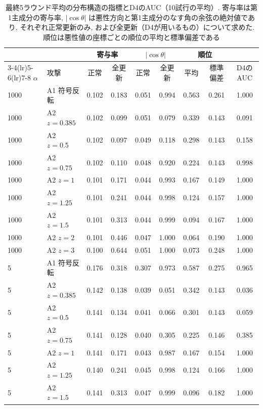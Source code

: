 \documentclass[a4j, twocolumn, dvipdfmx]{jsarticle}
\begin{document}
\begin{table}[t]
\centering
\caption{最終5ラウンド平均の分布構造の指標とD4のAUC（10試行の平均）. 寄与率は第1主成分の寄与率, $|\cos\theta|$ は悪性方向と第1主成分のなす角の余弦の絶対値であり, それぞれ正常更新のみ, および全更新（D4が用いるもの）について求めた. 順位は悪性値の座標ごとの順位の平均と標準偏差である}
\label{tab:structure}
\small
\begin{tabular}{@{}llccccccc@{}}
\toprule
 & & \multicolumn{2}{c}{寄与率} & \multicolumn{2}{c}{$|\cos\theta|$} & \multicolumn{2}{c}{順位} & \\
\cmidrule(lr){3-4}\cmidrule(lr){5-6}\cmidrule(lr){7-8}
$\alpha$ & 攻撃 & 正常 & 全更新 & 正常 & 全更新 & 平均 & 標準偏差 & D4のAUC \\
\midrule
1000 & A1 符号反転 & 0.102 & 0.183 & 0.051 & 0.994 & 0.563 & 0.261 & 1.000 \\
1000 & A2 $z{=}0.385$ & 0.102 & 0.099 & 0.051 & 0.079 & 0.339 & 0.143 & 0.091 \\
1000 & A2 $z{=}0.5$ & 0.102 & 0.097 & 0.049 & 0.118 & 0.298 & 0.143 & 0.158 \\
1000 & A2 $z{=}0.75$ & 0.102 & 0.110 & 0.048 & 0.920 & 0.224 & 0.143 & 0.998 \\
1000 & A2 $z{=}1$ & 0.101 & 0.171 & 0.044 & 0.993 & 0.167 & 0.149 & 1.000 \\
1000 & A2 $z{=}1.25$ & 0.101 & 0.241 & 0.044 & 0.998 & 0.124 & 0.157 & 1.000 \\
1000 & A2 $z{=}1.5$ & 0.101 & 0.313 & 0.044 & 0.999 & 0.094 & 0.167 & 1.000 \\
1000 & A2 $z{=}2$ & 0.101 & 0.446 & 0.047 & 1.000 & 0.064 & 0.190 & 1.000 \\
1000 & A2 $z{=}3$ & 0.100 & 0.644 & 0.051 & 1.000 & 0.073 & 0.248 & 1.000 \\
\midrule
5 & A1 符号反転 & 0.176 & 0.318 & 0.307 & 0.973 & 0.587 & 0.275 & 0.965 \\
5 & A2 $z{=}0.385$ & 0.142 & 0.138 & 0.039 & 0.051 & 0.342 & 0.143 & 0.036 \\
5 & A2 $z{=}0.5$ & 0.141 & 0.134 & 0.041 & 0.066 & 0.301 & 0.143 & 0.059 \\
5 & A2 $z{=}0.75$ & 0.141 & 0.128 & 0.040 & 0.305 & 0.225 & 0.146 & 0.385 \\
5 & A2 $z{=}1$ & 0.141 & 0.171 & 0.043 & 0.987 & 0.167 & 0.154 & 1.000 \\
5 & A2 $z{=}1.25$ & 0.140 & 0.241 & 0.045 & 0.998 & 0.124 & 0.166 & 1.000 \\
5 & A2 $z{=}1.5$ & 0.141 & 0.313 & 0.047 & 0.999 & 0.096 & 0.182 & 1.000 \\

\end{tabular}
\end{table}
\end{document}
